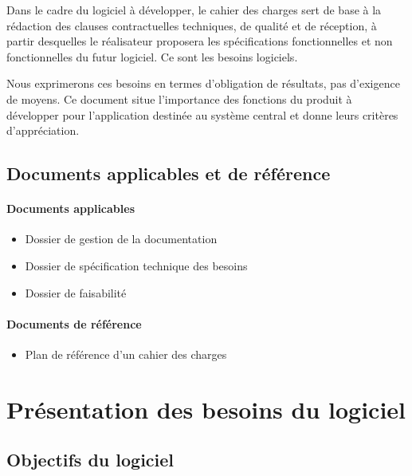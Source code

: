 \documentclass[a4paper, 11pt, final]{article}
\begin{document}
Dans le cadre du logiciel à développer, le cahier des charges sert de base à la
 rédaction des clauses contractuelles techniques, de qualité et de réception,
à partir desquelles le réalisateur proposera les spécifications fonctionnelles
et non fonctionnelles du futur logiciel. Ce sont les besoins logiciels.

Nous exprimerons ces besoins en termes d'obligation de résultats, pas d'exigence de moyens.
Ce document situe l'importance des fonctions du produit à développer pour l'application
destinée au système central et donne leurs critères d'appréciation.

\subsection{Documents applicables et de référence}
\paragraph{Documents applicables}
\begin{itemize}
\item Dossier de gestion de la documentation
\item Dossier de spécification technique des besoins
\item Dossier de faisabilité
\end{itemize}

\paragraph{Documents de référence}
\begin{itemize}
\item Plan de référence d'un cahier des charges
\end{itemize}

\section{Présentation des besoins du logiciel}

\subsection{Objectifs du logiciel}
\end{document}
